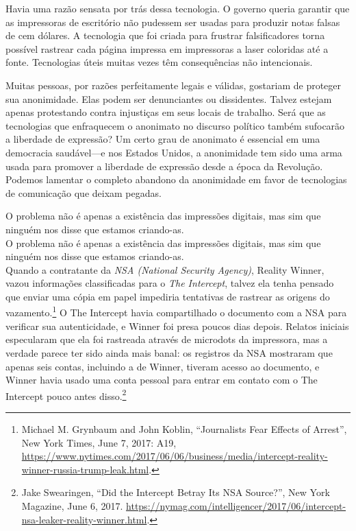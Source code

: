 \documentclass{book}
\newcommand{\ingles}[1]{\textit{#1}}
\begin{document}
Havia uma razão sensata por trás dessa tecnologia. O governo queria garantir
que as impressoras de escritório não pudessem ser usadas para produzir notas
falsas de cem dólares. A tecnologia que foi criada para frustrar falsificadores
torna possível rastrear cada página impressa em impressoras a laser coloridas
até a fonte. Tecnologias úteis muitas vezes têm consequências não intencionais.

Muitas pessoas, por razões perfeitamente legais e válidas, gostariam de
proteger sua anonimidade. Elas podem ser denunciantes ou dissidentes. Talvez
estejam apenas protestando contra injustiças em seus locais de trabalho. Será
que as tecnologias que enfraquecem o anonimato no discurso político também
sufocarão a liberdade de expressão? Um certo grau de anonimato é essencial em
uma democracia saudável---e nos Estados Unidos, a anonimidade tem sido uma arma
usada para promover a liberdade de expressão desde a época da Revolução.
Podemos lamentar o completo abandono da anonimidade em favor de tecnologias de
comunicação que deixam pegadas.

O problema não é apenas a existência das impressões digitais, mas sim que
ninguém nos disse que estamos criando-as.\\

O problema não é apenas a existência das impressões digitais, mas sim que
ninguém nos disse que estamos criando-as.\\

Quando a contratante da \ingles{NSA (National Security Agency)}, Reality
Winner, vazou informações classificadas para o \ingles{The Intercept}, talvez
ela tenha pensado que enviar uma cópia em papel impediria tentativas de
rastrear as origens do vazamento.\footnote{Michael M. Grynbaum and John Koblin,
``Journalists Fear Effects of Arrest'', New York Times, June 7, 2017: A19,
\url{https://www.nytimes.com/2017/06/06/business/media/intercept-reality-winner-russia-trump-leak.html}.}
O The Intercept havia compartilhado o documento com a NSA para verificar sua
autenticidade, e Winner foi presa poucos dias depois. Relatos iniciais
especularam que ela foi rastreada através de microdots da impressora, mas a
verdade parece ter sido ainda mais banal: os registros da NSA mostraram que
apenas seis contas, incluindo a de Winner, tiveram acesso ao documento, e
Winner havia usado uma conta pessoal para entrar em contato com o The Intercept
pouco antes disso.\footnote{Jake Swearingen, ``Did the Intercept Betray Its NSA
Source?'', New York Magazine, June 6, 2017.
\url{https://nymag.com/intelligencer/2017/06/intercept-nsa-leaker-reality-winner.html}.}
\end{document}
